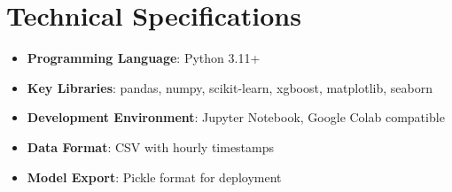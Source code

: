 \documentclass[12pt,a4paper]{article}
\begin{document}
\section{Technical Specifications}
\begin{itemize}
    \item \textbf{Programming Language}: Python 3.11+
    \item \textbf{Key Libraries}: pandas, numpy, scikit-learn, xgboost, matplotlib, seaborn
    \item \textbf{Development Environment}: Jupyter Notebook, Google Colab compatible
    \item \textbf{Data Format}: CSV with hourly timestamps
    \item \textbf{Model Export}: Pickle format for deployment
\end{itemize}
\end{document}

